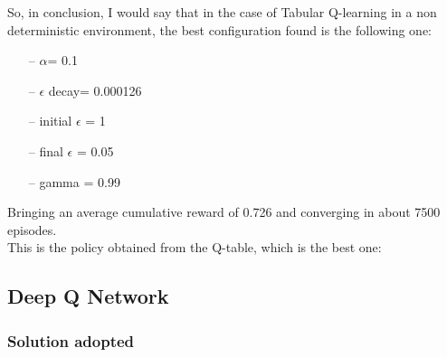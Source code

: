 \documentclass{article}
\begin{document}
So, in conclusion, I would say that in the case of Tabular Q-learning in a non deterministic environment, the best configuration found is the following one:
\begin{itemize}
\item[--] $\alpha$= 0.1
\item[--] $\epsilon$ decay= 0.000126
\item[--] initial $\epsilon$ = 1
\item[--] final $\epsilon$ = 0.05
\item[--] gamma = 0.99
\end{itemize}


Bringing an average cumulative reward of 0.726 and converging in about 7500 episodes.
\\
This is the policy obtained from the Q-table, which is the best one:
\begin{center}
    \centering
\end{center}
    

\subsection{Deep Q Network}

\subsubsection{Solution adopted}
\end{document}

